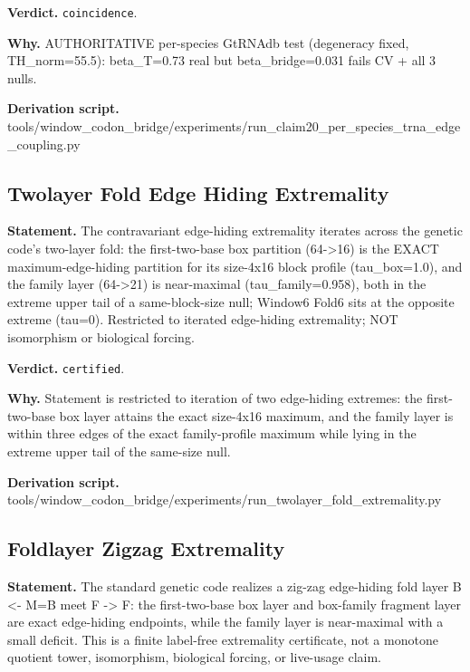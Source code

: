 \textbf{Verdict.} \texttt{coincidence}.

\textbf{Why.} AUTHORITATIVE per-species GtRNAdb test (degeneracy fixed, TH\_norm=55.5): beta\_T=0.73 real but
beta\_bridge=0.031 fails CV + all 3 nulls.

\textbf{Derivation script.} tools/window\_codon\_bridge/experiments/run\_claim20\_per\_species\_trna\_edge\_coupling.py

\subsection{Twolayer Fold Edge Hiding Extremality}\label{sec:bridge-twolayer-fold-edge-hiding-extremality}
\textbf{Statement.} The contravariant edge-hiding extremality iterates across the genetic code's two-layer fold: the
first-two-base box partition (64->16) is the EXACT maximum-edge-hiding partition for its size-4x16
block profile (tau\_box=1.0), and the family layer (64->21) is near-maximal (tau\_family=0.958),
both in the extreme upper tail of a same-block-size null; Window6 Fold6 sits at the opposite extreme
(tau=0). Restricted to iterated edge-hiding extremality; NOT isomorphism or biological forcing.

\textbf{Verdict.} \texttt{certified}.

\textbf{Why.} Statement is restricted to iteration of two edge-hiding extremes: the first-two-base box layer
attains the exact size-4x16 maximum, and the family layer is within three edges of the exact
family-profile maximum while lying in the extreme upper tail of the same-size null.

\textbf{Derivation script.} tools/window\_codon\_bridge/experiments/run\_twolayer\_fold\_extremality.py

\subsection{Foldlayer Zigzag Extremality}\label{sec:bridge-foldlayer-zigzag-extremality}
\textbf{Statement.} The standard genetic code realizes a zig-zag edge-hiding fold layer B <- M=B meet F -> F: the
first-two-base box layer and box-family fragment layer are exact edge-hiding endpoints, while the
family layer is near-maximal with a small deficit. This is a finite label-free extremality
certificate, not a monotone quotient tower, isomorphism, biological forcing, or live-usage claim.

